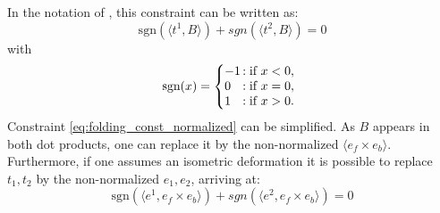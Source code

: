 In the notation of , this constraint can be written as:
\begin{equation} \label{eq:folding_const_normalized} 
\text{sgn}(\langle t^1,B\rangle) +  {sgn}(\langle t^2,B\rangle) = 0
\end{equation}
with 
\begin{equation} \label{eq:sign}
\text{sgn}(x) = \left\{
     \begin{array}{@{}l@{\thinspace}l}
       -1  &: \text{if } x < 0, \\
       0 &: \text{if } x = 0, \\
       1 &: \text{if } x > 0. \\
     \end{array}
   \right.
\end{equation}
 Constraint \eqref{eq:folding_const_normalized} can be simplified. As $B$ appears in both dot products, one can replace it by the non-normalized $\langle e_f \times e_b \rangle$. Furthermore, if one assumes an isometric deformation it is possible to replace $t_1,t_2$ by the non-normalized $e_1,e_2$, arriving at:
\begin{equation} \label{eq:folding_const}
\text{sgn}(\langle e^1,e_f \times e_b \rangle) +  {sgn}(\langle e^2,e_f \times e_b\rangle) = 0
\end{equation}

